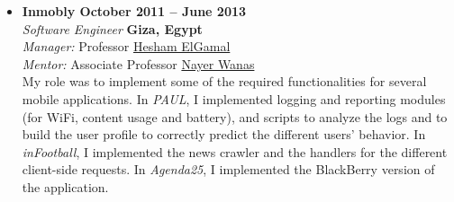 \documentclass[10pt,a4]{article}
\begin{document}
\begin{itemize}
\item{\bf Inmobly \hfill {\bf October 2011 -- June 2013}}\\
{\it Software Engineer} \hfill {\bf Giza, Egypt}\\
{\it Manager:} Professor \href{https://ece.osu.edu/people/elgamal}{Hesham ElGamal}\\ 
{\it Mentor:} Associate Professor \href{https://eg.linkedin.com/in/nwanas}{Nayer Wanas}\\
My role was to implement some of the required functionalities for several mobile applications. In {\it PAUL}, I implemented logging and reporting modules (for Wi­Fi, content usage and battery), and scripts to analyze the logs and to build the user profile to correctly predict the different users' behavior. In {\it inFootball}, I implemented the news crawler and the handlers for the different client-side requests. In {\it Agenda25}, I implemented the BlackBerry version of the application.



\end{itemize}
\end{document}
